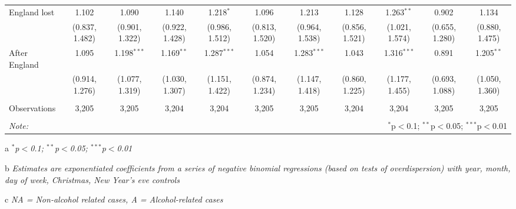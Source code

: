 \documentclass[12pt, a4paper]{article}
\begin{document}
\begin{table}
{\begin{threeparttable}
\begin{tabular}{@{\extracolsep{5pt}}lcccccccccc}
  England lost & 1.102 & 1.090 & 1.140 & 1.218$^{*}$ & 1.096 & 1.213 & 1.128 & 1.263$^{**}$ & 0.902 & 1.134 \\ 
  & (0.837, 1.482) & (0.901, 1.322) & (0.922, 1.428) & (0.986, 1.512) & (0.813, 1.520) & (0.964, 1.538) & (0.856, 1.521) & (1.021, 1.574) & (0.655, 1.280) & (0.880, 1.475) \\ 
  After England & 1.095 & 1.198$^{***}$ & 1.169$^{**}$ & 1.287$^{***}$ & 1.054 & 1.283$^{***}$ & 1.043 & 1.316$^{***}$ & 0.891 & 1.205$^{**}$ \\ 
  & (0.914, 1.276) & (1.077, 1.319) & (1.030, 1.307) & (1.151, 1.422) & (0.874, 1.234) & (1.147, 1.418) & (0.860, 1.225) & (1.177, 1.455) & (0.693, 1.088) & (1.050, 1.360) \\ 
 \hline \\[-1.8ex] 
Observations & 3,205 & 3,205 & 3,204 & 3,204 & 3,205 & 3,205 & 3,204 & 3,204 & 3,205 & 3,205 \\ 
\hline 
\hline \\[-1.8ex] 
\textit{Note:}  & \multicolumn{10}{r}{$^{*}$p$<$0.1; $^{**}$p$<$0.05; $^{***}$p$<$0.01} \\ 
\end{tabular} 
\begin{tablenotes}
      \item[a] \textit{$^{*}$p$<$0.1; $^{**}$p$<$0.05; $^{***}$p$<$0.01}
      \item[b] \textit{Estimates are exponentiated coefficients from a series of negative binomial regressions (based on tests of overdispersion)  with year, month, day of week, Christmas, New Year's eve controls}
      \item[c] \textit{NA = Non-alcohol related cases, A = Alcohol-related cases}
    \end{tablenotes}
\end{threeparttable}   }
\end{table}
\end{document}
